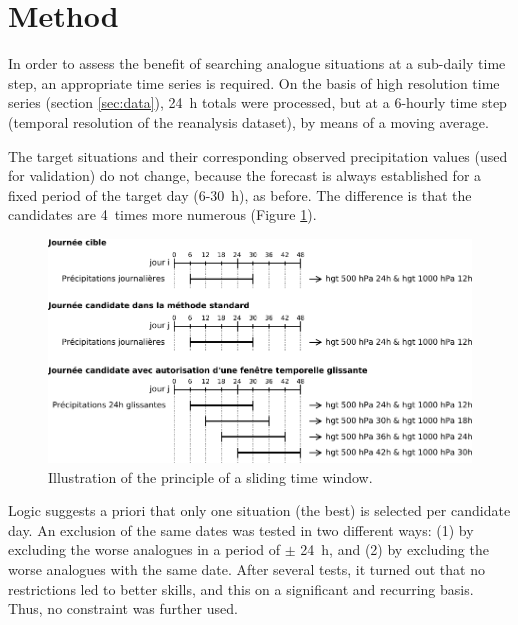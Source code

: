 \documentclass[hess]{copernicus}
\begin{document}



\section{Method}
\label{sec:method}

In order to assess the benefit of searching analogue situations at a sub-daily time step, an appropriate time series is required. On the basis of high resolution time series (section \ref{sec:data}), 24~h totals were processed, but at a 6-hourly time step (temporal resolution of the reanalysis dataset), by means of a moving average. 

The target situations and their corresponding observed precipitation values (used for validation) do not change, because the forecast is always established for a fixed period of the target day (6-30~h), as before. The difference is that the candidates are 4~times more numerous (Figure \ref{fig:principle}).

\begin{figure}[htb]
	\begin{center}
		\includegraphics[width=14cm]{figures/Illustration_fenetre_glissante.pdf}
	\end{center}
	\caption{Illustration of the principle of a sliding time window. }
	\label{fig:principle}
\end{figure}

Logic suggests a priori that only one situation (the best) is selected per candidate day. An exclusion of the same dates was tested in two different ways: (1)
by excluding the worse analogues in a period of $\pm$ 24~h, and (2) by excluding the worse analogues with the same date. After several tests, it turned out that no restrictions led to better skills, and this on a significant and recurring basis. Thus, no constraint was further used.
\end{document}
